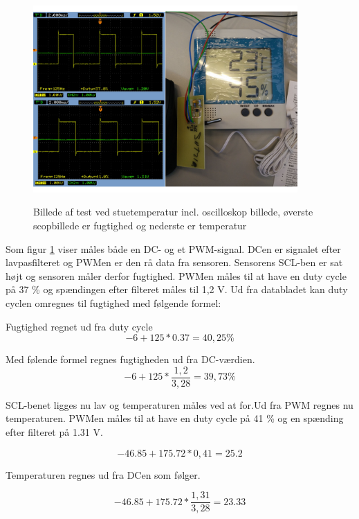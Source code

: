 \begin{figure}[h]
\centering
{\includegraphics[width=0.90\textwidth]{filer/modultest/Billeder/test_stue}}
\caption{Billede af test ved stuetemperatur incl. oscilloskop billede, øverste scopbillede er fugtighed og nederste er temperatur}
\label{lab:test_stue}
\end{figure}

Som figur \ref{lab:test_stue} viser måles både en DC- og et PWM-signal. DCen er signalet efter lavpasfilteret og PWMen er den rå data fra sensoren. 
Sensorens SCL-ben er sat højt og sensoren måler derfor fugtighed. PWMen måles til at have en duty cycle på 37 \% og spændingen efter filteret måles til 1,2 V. Ud fra databladet kan duty cyclen omregnes til fugtighed med følgende formel:

Fugtighed regnet ud fra duty cycle
\begin{equation}
-6+125*0.37=40,25\%
\end{equation}

Med følende formel regnes fugtigheden ud fra DC-værdien.
\begin{equation}
-6+125*\frac{1,2}{3,28}= 39,73\%
\end{equation}

SCL-benet ligges nu lav og temperaturen måles ved at for.Ud fra PWM regnes nu temperaturen. PWMen måles til at have en duty cycle på 41 \% og en spænding efter filteret på 1.31 V. 

\begin{equation}
-46.85+175.72*0,41=25.2
\end{equation}

Temperaturen regnes ud fra DCen som følger. 

\begin{equation}
-46.85+175.72*\frac{1,31}{3,28}=23.33
\end{equation}


